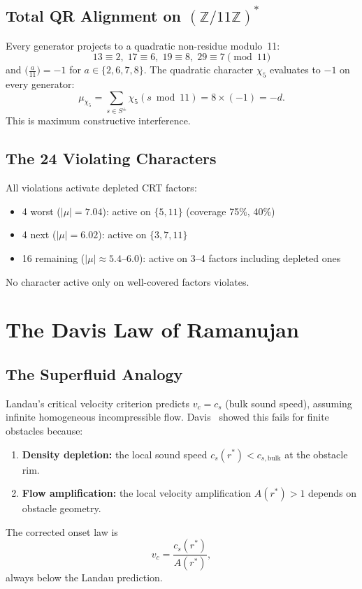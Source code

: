 \documentclass[12pt,reqno]{amsart}
\theoremstyle{plain}
\theoremstyle{definition}
\theoremstyle{remark}
\newcommand{\ZZ}{\mathbb{Z}}
\begin{document}
\subsection{Total QR Alignment on $(\ZZ/11\ZZ)^*$}

Every generator projects to a quadratic non-residue modulo~11:
\[
  13 \equiv 2, \; 17 \equiv 6, \; 19 \equiv 8, \; 29 \equiv 7
  \pmod{11}
\]
and $\bigl(\frac{a}{11}\bigr) = -1$ for $a \in \{2, 6, 7, 8\}$.  The
quadratic character $\chi_5$ evaluates to $-1$ on every generator:
\begin{equation}\label{eq:worst_eval}
  \mu_{\chi_5} = \sum_{s \in S^\pm} \chi_5(s \bmod 11)
  = 8 \times (-1) = -d.
\end{equation}
This is maximum constructive interference.

\subsection{The 24 Violating Characters}

All violations activate depleted CRT factors:
\begin{itemize}[nosep]
  \item 4 worst ($|\mu| = 7.04$): active on
    $\{5, 11\}$ (coverage 75\%, 40\%)
  \item 4 next ($|\mu| = 6.02$): active on
    $\{3, 7, 11\}$
  \item 16 remaining ($|\mu| \approx 5.4$--$6.0$): active on
    3--4 factors including depleted ones
\end{itemize}
No character active only on well-covered factors violates.


\section{The Davis Law of Ramanujan}\label{sec:davis_law}

\subsection{The Superfluid Analogy}

Landau's critical velocity criterion predicts $v_c = c_s$ (bulk sound
speed), assuming infinite homogeneous incompressible flow.
Davis~\cite{davis2026landau} showed this fails for finite obstacles
because:
\begin{enumerate}[nosep]
  \item \textbf{Density depletion:} the local sound speed
    $c_s(r^*) < c_{s,\mathrm{bulk}}$ at the obstacle rim.
  \item \textbf{Flow amplification:} the local velocity amplification
    $A(r^*) > 1$ depends on obstacle geometry.
\end{enumerate}
The corrected onset law is
\begin{equation}\label{eq:davis_landau}
  v_c = \frac{c_s(r^*)}{A(r^*)},
\end{equation}
always below the Landau prediction.
\end{document}
